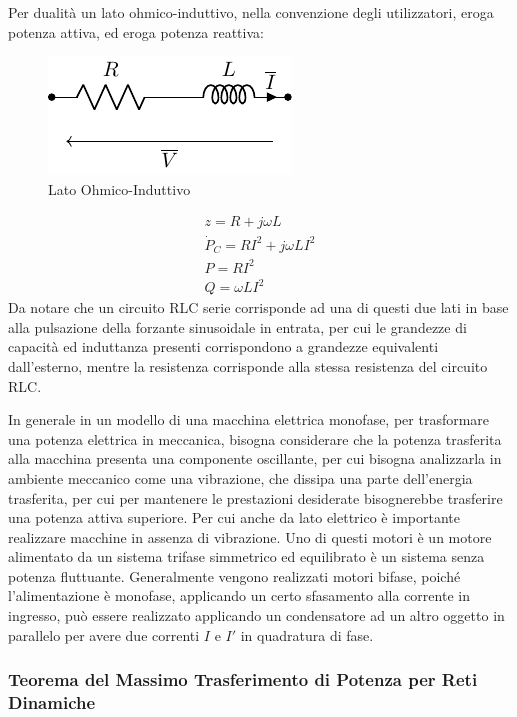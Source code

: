 \documentclass{article}
\numberwithin{equation}{subsection}
\begin{document}
Per dualità un lato ohmico-induttivo, nella convenzione degli utilizzatori, eroga potenza attiva, ed eroga potenza reattiva: 
\begin{figure}[H]%
    \centering
    \includegraphics{rl-serie-fasori.pdf}
    \caption{Lato Ohmico-Induttivo}
    \label{fig:rl-serie-fasori}
\end{figure}

\begin{gather*}
    z=R+j\omega L\\
    \dot P_C=RI^2+j\omega LI^2\\
    P=RI^2\\
    Q=\omega LI^2
\end{gather*}
Da notare che un circuito RLC serie corrisponde ad una di questi due lati in base alla pulsazione della forzante sinusoidale in entrata, per cui le grandezze di capacità ed 
induttanza presenti corrispondono a grandezze equivalenti dall'esterno, mentre la resistenza corrisponde alla stessa resistenza del circuito RLC. 


In generale in un modello di una macchina elettrica monofase, per trasformare una potenza elettrica in meccanica, bisogna considerare che la potenza trasferita alla macchina 
presenta una componente oscillante, per cui bisogna analizzarla in ambiente meccanico come una vibrazione, che dissipa una parte dell'energia trasferita, per cui 
per mantenere le prestazioni desiderate bisognerebbe trasferire una potenza attiva superiore. Per cui anche da lato elettrico è importante realizzare macchine in assenza di 
vibrazione. Uno di questi motori è un motore alimentato da un sistema trifase simmetrico ed equilibrato è un sistema senza potenza fluttuante. Generalmente vengono realizzati 
motori bifase, poiché l'alimentazione è monofase, applicando un certo sfasamento alla corrente in ingresso, può essere realizzato applicando un condensatore ad un altro oggetto 
in parallelo per avere due correnti $I$ e $I'$ in quadratura di fase. 

\subsubsection{Teorema del Massimo Trasferimento di Potenza per Reti Dinamiche}
\end{document}
